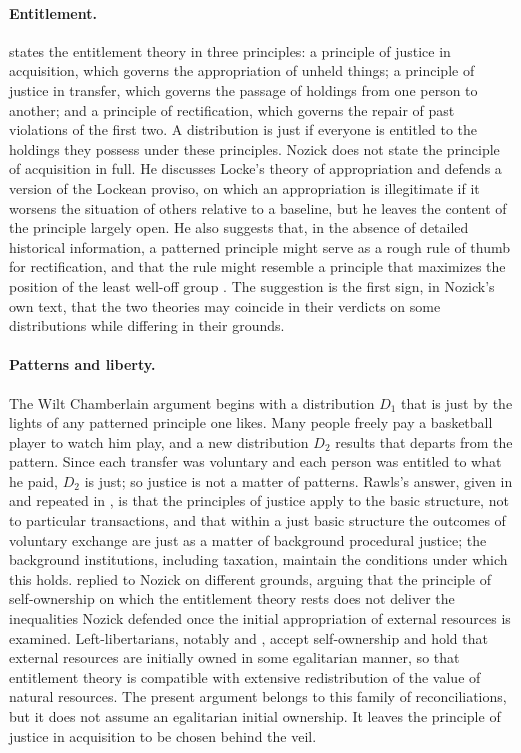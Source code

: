 \documentclass{situationist-preprint}
\begin{document}
\paragraph{Entitlement.} \citet[ch.~7]{Nozick1974} states the entitlement theory in three principles: a principle of justice in acquisition, which governs the appropriation of unheld things; a principle of justice in transfer, which governs the passage of holdings from one person to another; and a principle of rectification, which governs the repair of past violations of the first two. A distribution is just if everyone is entitled to the holdings they possess under these principles. Nozick does not state the principle of acquisition in full. He discusses Locke's theory of appropriation and defends a version of the Lockean proviso, on which an appropriation is illegitimate if it worsens the situation of others relative to a baseline, but he leaves the content of the principle largely open. He also suggests that, in the absence of detailed historical information, a patterned principle might serve as a rough rule of thumb for rectification, and that the rule might resemble a principle that maximizes the position of the least well-off group \citep[ch.~7]{Nozick1974}. The suggestion is the first sign, in Nozick's own text, that the two theories may coincide in their verdicts on some distributions while differing in their grounds.

\paragraph{Patterns and liberty.} The Wilt Chamberlain argument begins with a distribution $D_1$ that is just by the lights of any patterned principle one likes. Many people freely pay a basketball player to watch him play, and a new distribution $D_2$ results that departs from the pattern. Since each transfer was voluntary and each person was entitled to what he paid, $D_2$ is just; so justice is not a matter of patterns. Rawls's answer, given in \citet{Rawls1977} and repeated in \citet{Rawls2001}, is that the principles of justice apply to the basic structure, not to particular transactions, and that within a just basic structure the outcomes of voluntary exchange are just as a matter of background procedural justice; the background institutions, including taxation, maintain the conditions under which this holds. \citet{Cohen1995} replied to Nozick on different grounds, arguing that the principle of self-ownership on which the entitlement theory rests does not deliver the inequalities Nozick defended once the initial appropriation of external resources is examined. Left-libertarians, notably \citet{Steiner1994} and \citet{Otsuka2003}, accept self-ownership and hold that external resources are initially owned in some egalitarian manner, so that entitlement theory is compatible with extensive redistribution of the value of natural resources. The present argument belongs to this family of reconciliations, but it does not assume an egalitarian initial ownership. It leaves the principle of justice in acquisition to be chosen behind the veil.
\end{document}
